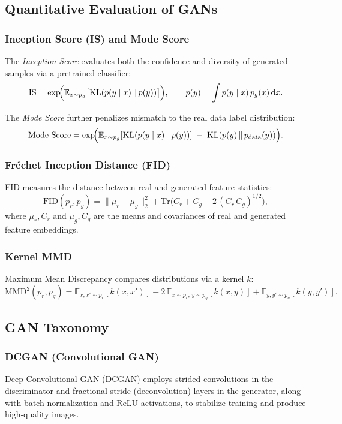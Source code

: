 \documentclass{article}
\begin{document}
\subsection{Quantitative Evaluation of GANs}

\subsubsection{Inception Score (IS) and Mode Score}
The \emph{Inception Score} evaluates both the confidence and diversity of generated samples via a pretrained classifier:
\[
\mathrm{IS}
= \exp\!\Bigl(\mathbb{E}_{x\sim p_g}\bigl[\mathrm{KL}(p(y\mid x)\,\|\,p(y))\bigr]\Bigr),
\qquad
p(y)=\int p(y\mid x)\,p_g(x)\,\mathrm{d}x.
\]

The \emph{Mode Score} further penalizes mismatch to the real data label distribution:
\[
\mathrm{Mode\ Score}
= \exp\!\Bigl(\mathbb{E}_{x\sim p_g}[\mathrm{KL}(p(y\mid x)\,\|\,p(y))]
\;-\;\mathrm{KL}(p(y)\,\|\,p_{\mathrm{data}}(y))\Bigr).
\]

\subsubsection{Fréchet Inception Distance (FID)}
FID measures the distance between real and generated feature statistics:
\[
\mathrm{FID}(p_r,p_g)
= \|\mu_r - \mu_g\|_2^2
  + \mathrm{Tr}\bigl(C_r + C_g - 2\,(C_r\,C_g)^{1/2}\bigr),
\]
where \(\mu_r, C_r\) and \(\mu_g, C_g\) are the means and covariances of real and generated feature embeddings.

\subsubsection{Kernel MMD}
Maximum Mean Discrepancy compares distributions via a kernel \(k\):
\[
\mathrm{MMD}^2(p_r,p_g)
= \mathbb{E}_{x,x'\sim p_r}[k(x,x')]
- 2\,\mathbb{E}_{x\sim p_r,\,y\sim p_g}[k(x,y)]
+ \mathbb{E}_{y,y'\sim p_g}[k(y,y')].
\]

\subsection{GAN Taxonomy}

\subsubsection{DCGAN (Convolutional GAN)}
Deep Convolutional GAN (DCGAN) employs strided convolutions in the discriminator and fractional‑stride (deconvolution) layers in the generator, along with batch normalization and ReLU activations, to stabilize training and produce high‑quality images.
\end{document}
